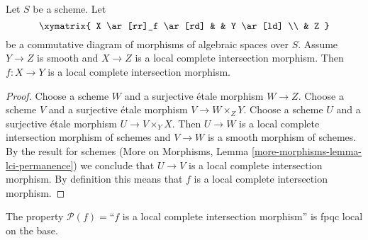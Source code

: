 \begin{lemma}
\label{lemma-lci-permanence}
Let $S$ be a scheme. Let
$$
\xymatrix{
X \ar[rr]_f \ar[rd] & & Y \ar[ld] \\
& Z
}
$$
be a commutative diagram of morphisms of algebraic spaces over $S$.
Assume $Y \to Z$ is smooth and $X \to Z$ is a
local complete intersection morphism.
Then $f : X \to Y$ is a local complete intersection morphism.
\end{lemma}

\begin{proof}
Choose a scheme $W$ and a surjective \'etale morphism $W \to Z$.
Choose a scheme $V$ and a surjective \'etale morphism $V \to W \times_Z Y$.
Choose a scheme $U$ and a surjective \'etale morphism $U \to V \times_Y X$.
Then $U \to W$ is a local complete intersection morphism of schemes and
$V \to W$ is a smooth morphism of schemes. By the result for schemes
(More on Morphisms, Lemma \ref{more-morphisms-lemma-lci-permanence})
we conclude that $U \to V$ is a local complete intersection morphism.
By definition this means that $f$ is a local complete intersection morphism.
\end{proof}

\begin{lemma}
\label{lemma-descending-property-lci}
The property $\mathcal{P}(f) =$``$f$ is a local complete intersection
morphism'' is fpqc local on the base.
\end{lemma}

